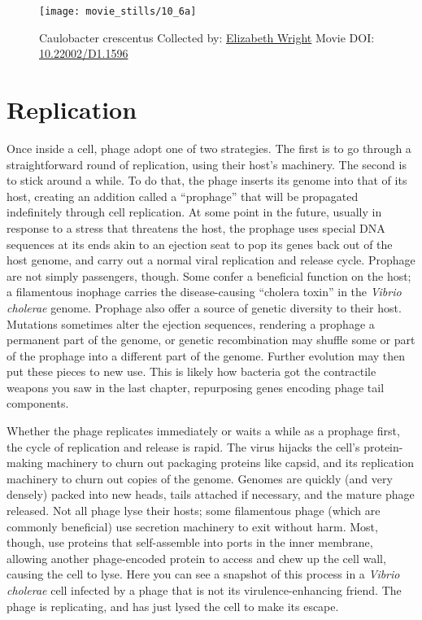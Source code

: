 \documentclass[]{tufte-book}
\begin{document}
\begin{figure}
\texttt{[image: movie\_stills/10\_6a]} \caption[Caulobacter crescentus Collected by:
\protect\hyperlink{elizabeth_wright}{Elizabeth Wright} Movie DOI:
\href{https://doi.org/10.22002/D1.1596}{10.22002/D1.1596}]{Caulobacter crescentus Collected by:
\protect\hyperlink{elizabeth_wright}{Elizabeth Wright} Movie DOI:
\href{https://doi.org/10.22002/D1.1596}{10.22002/D1.1596}}\label{fig:10-6a}
\end{figure}

\section{Replication}\label{replication}

Once inside a cell, phage adopt one of two strategies. The first is to
go through a straightforward round of replication, using their host's
machinery. The second is to stick around a while. To do that, the phage
inserts its genome into that of its host, creating an addition called a
``prophage'' that will be propagated indefinitely through cell
replication. At some point in the future, usually in response to a
stress that threatens the host, the prophage uses special DNA sequences
at its ends akin to an ejection seat to pop its genes back out of the
host genome, and carry out a normal viral replication and release cycle.
Prophage are not simply passengers, though. Some confer a beneficial
function on the host; a filamentous inophage carries the disease-causing
``cholera toxin'' in the \emph{Vibrio cholerae} genome. Prophage also
offer a source of genetic diversity to their host. Mutations sometimes
alter the ejection sequences, rendering a prophage a permanent part of
the genome, or genetic recombination may shuffle some or part of the
prophage into a different part of the genome. Further evolution may then
put these pieces to new use. This is likely how bacteria got the
contractile weapons you saw in the last chapter, repurposing genes
encoding phage tail components.

Whether the phage replicates immediately or waits a while as a prophage
first, the cycle of replication and release is rapid. The virus hijacks
the cell's protein-making machinery to churn out packaging proteins like
capsid, and its replication machinery to churn out copies of the genome.
Genomes are quickly (and very densely) packed into new heads, tails
attached if necessary, and the mature phage released. Not all phage lyse
their hosts; some filamentous phage (which are commonly beneficial) use
secretion machinery to exit without harm. Most, though, use proteins
that self-assemble into ports in the inner membrane, allowing another
phage-encoded protein to access and chew up the cell wall, causing the
cell to lyse. Here you can see a snapshot of this process in a
\emph{Vibrio cholerae} cell infected by a phage that is not its
virulence-enhancing friend. The phage is replicating, and has just lysed
the cell to make its escape.
\end{document}
